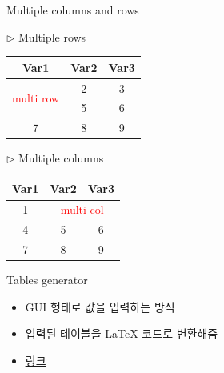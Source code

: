\documentclass{beamer}
\begin{document}
\begin{frame}{Multiple columns and rows}
	\begin{multicols}{2}
		\noindent  
		$\triangleright$ Multiple rows
		\begin{table}[ht]
			\centering
			\begin{tabular}{ccc}
			\hline  
			Var1 & Var2 & Var3 \\ 
			\hline
			\multirow{2}{4em}{\textcolor{red}{multi row}} & 2 & 3 \\
			  & 5 & 6 \\
			7 & 8 & 9 \\
			\hline
		\end{tabular}
		\end{table} 
		
		\columnbreak
		
		$\triangleright$ Multiple columns
		\begin{table}[ht]
		\centering
		\begin{tabular}{ccc}
		\hline 
		Var1 & Var2 & Var3 \\ 
		\hline
		1 & \multicolumn{2}{c}{\textcolor{red}{multi col}} \\
		4 & 5 & 6 \\
		7 & 8 & 9 \\
		\hline
		\end{tabular}
		\end{table} 
	\end{multicols}
\end{frame}

\begin{frame}{Tables generator}
	\begin{itemize}
		\item {
			GUI 형태로 값을 입력하는 방식
		}
		\item {
			입력된 테이블을 \textrm{\LaTeX} 코드로 변환해줌
		}
		\item {
			\href{https://www.tablesgenerator.com/}{\underline{링크}}
		}
	\end{itemize}
\end{frame}
\end{document}
